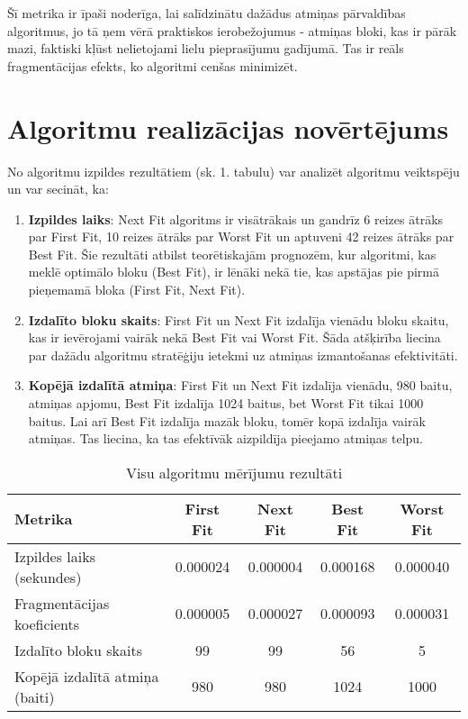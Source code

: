 \documentclass{report}
\begin{document}
	Šī metrika ir īpaši noderīga, lai salīdzinātu dažādus atmiņas pārvaldības algoritmus, jo tā ņem vērā praktiskos ierobežojumus - atmiņas bloki, kas ir pārāk mazi, faktiski kļūst nelietojami lielu pieprasījumu gadījumā. Tas ir reāls fragmentācijas efekts, ko algoritmi cenšas minimizēt.
	
	\section{Algoritmu realizācijas novērtējums}
	
	No algoritmu izpildes rezultātiem (sk. 1. tabulu) var analizēt algoritmu veiktspēju un var secināt, ka:
	
	\begin{enumerate}
		\item \textbf{Izpildes laiks}: Next Fit algoritms ir visātrākais un gandrīz 6 reizes ātrāks par First Fit, 10 reizes ātrāks par Worst Fit un aptuveni 42 reizes ātrāks par Best Fit. Šie rezultāti atbilst teorētiskajām prognozēm, kur algoritmi, kas meklē optimālo bloku (Best Fit), ir lēnāki nekā tie, kas apstājas pie pirmā pieņemamā bloka (First Fit, Next Fit).
		
		\item \textbf{Izdalīto bloku skaits}: First Fit un Next Fit izdalīja vienādu bloku skaitu, kas ir ievērojami vairāk nekā Best Fit vai Worst Fit. Šāda atšķirība liecina par dažādu algoritmu stratēģiju ietekmi uz atmiņas izmantošanas efektivitāti.
		
		\item \textbf{Kopējā izdalītā atmiņa}: First Fit un Next Fit izdalīja vienādu, 980 baitu, atmiņas apjomu, Best Fit izdalīja 1024 baitus, bet Worst Fit tikai 1000 baitus. Lai arī Best Fit izdalīja mazāk bloku, tomēr kopā izdalīja vairāk atmiņas. Tas liecina, ka tas efektīvāk aizpildīja pieejamo atmiņas telpu.
	\end{enumerate}
	
	\begin{table}[h]
		\centering
		\begin{tabular}{lcccc}
			\toprule
			\textbf{Metrika} & \textbf{First Fit} & \textbf{Next Fit} & \textbf{Best Fit} & \textbf{Worst Fit} \\
			\midrule
			Izpildes laiks (sekundes) & 0.000024 & 0.000004 & 0.000168 & 0.000040 \\
			Fragmentācijas koeficients & 0.000005 & 0.000027 & 0.000093 & 0.000031 \\
			Izdalīto bloku skaits & 99 & 99 & 56 & 5 \\
			Kopējā izdalītā atmiņa (baiti) & 980 & 980 & 1024 & 1000 \\
			\bottomrule
		\end{tabular}
		\caption{Visu algoritmu mērījumu rezultāti}
		\label{tab:performance}
	\end{table}
	
\end{document}
